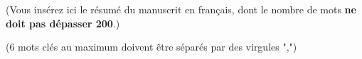\begin{abstractFr}
	
	(Vous insérez ici le résumé du manuscrit en français, dont le nombre de mots \textbf{ne doit pas dépasser 200}.)
	
\end{abstractFr}

\begin{keywordsFr}
	(6 mots clés au maximum doivent être séparés par des virgules ",")
\end{keywordsFr}